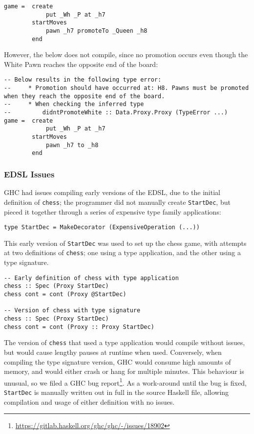 \documentclass[12pt, a4paper, bibliography=totocnumbered]{scrartcl}
\begin{document}
\begin{lstlisting}
game =  create
            put _Wh _P at _h7
        startMoves
            pawn _h7 promoteTo _Queen _h8
        end
\end{lstlisting}

However, the below does not compile, since no promotion occurs even though the White Pawn reaches the opposite end of the board:

\begin{lstlisting}
-- Below results in the following type error:
--     * Promotion should have occurred at: H8. Pawns must be promoted when they reach the opposite end of the board.
--     * When checking the inferred type
--         didntPromoteWhite :: Data.Proxy.Proxy (TypeError ...)
game =  create
            put _Wh _P at _h7
        startMoves
            pawn _h7 to _h8
        end
\end{lstlisting}

\subsubsection{EDSL Issues}

GHC had issues compiling early versions of the EDSL, due to the initial definition of \lstinline[basicstyle=\ttfamily]{chess}; the programmer did not manually create \lstinline[basicstyle=\ttfamily]{StartDec}, but pieced it together through a series of expensive type family applications:

\begin{lstlisting}
type StartDec = MakeDecorator (ExpensiveOperation (...))
\end{lstlisting}

This early version of \lstinline[basicstyle=\ttfamily]{StartDec} was used to set up the chess game, with attempts at two definitions of \lstinline[basicstyle=\ttfamily]{chess}; one using a type application, and the other using a type signature.

\begin{lstlisting}
-- Early definition of chess with type application
chess :: Spec (Proxy StartDec)
chess cont = cont (Proxy @StartDec)

-- Version of chess with type signature
chess :: Spec (Proxy StartDec)
chess cont = cont (Proxy :: Proxy StartDec)
\end{lstlisting}

The version of \lstinline[basicstyle=\ttfamily]{chess} that used a type application would compile without issues, but would cause lengthy pauses at runtime when used. Conversely, when compiling the type signature version, GHC would consume high amounts of memory, and would either crash or hang for multiple minutes. This behaviour is unusual, so we filed a GHC bug report\footnote{\url{https://gitlab.haskell.org/ghc/ghc/-/issues/18902}}. As a work-around until the bug is fixed, \lstinline[basicstyle=\ttfamily]{StartDec} is manually written out in full in the source Haskell file, allowing compilation and usage of either definition with no issues.
\end{document}
